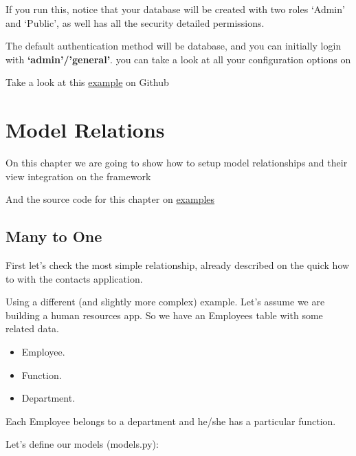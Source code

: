 \documentclass[letterpaper,10pt,english]{sphinxmanual}
\begin{document}
If you run this, notice that your database will be created with two roles `Admin' and `Public',
as well has all the security detailed permissions.

The default authentication method will be database, and you can initially login with \textbf{`admin'/'general'}.
you can take a look at all your configuration options on {\hyperref[config::doc]{}}

Take a look at this \href{https://github.com/dpgaspar/Flask-AppBuilder/tree/master/examples/quickminimal}{example} on Github


\section{Model Relations}
\label{relations:model-relations}\label{relations::doc}
On this chapter we are going to show how to setup model relationships and their
view integration on the framework

And the source code for this chapter on
\href{https://github.com/dpgaspar/Flask-AppBuilder/tree/master/examples/employees}{examples}


\subsection{Many to One}
\label{relations:many-to-one}
First let's check the most simple relationship, already described on the quick how to with the contacts
application.

Using a different (and slightly more complex) example. Let's assume we are building a human resources app.
So we have an Employees table with some related data.
\begin{itemize}
\item {} 
Employee.

\item {} 
Function.

\item {} 
Department.

\end{itemize}

Each Employee belongs to a department and he/she has a particular function.

Let's define our models (models.py):
\end{document}
